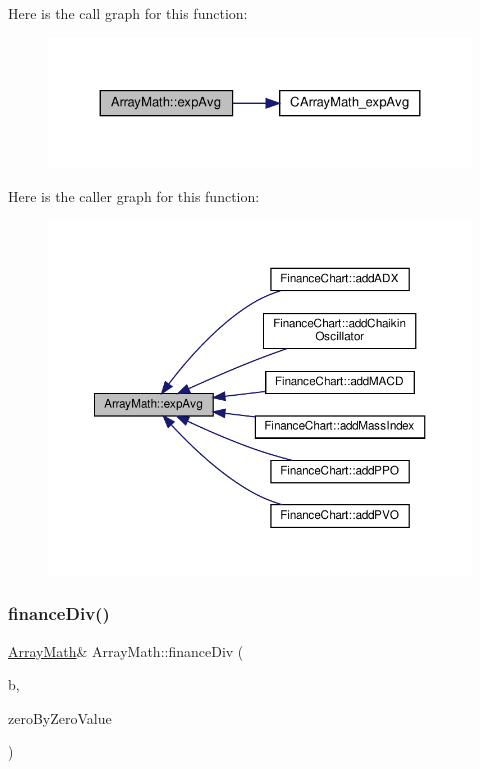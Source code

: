 Here is the call graph for this function\+:
\nopagebreak
\begin{figure}[H]
\begin{center}
\leavevmode
\includegraphics[width=324pt]{class_array_math_a2f9029cfd45e1094dd6aeb549bbcd107_cgraph}
\end{center}
\end{figure}
Here is the caller graph for this function\+:
\nopagebreak
\begin{figure}[H]
\begin{center}
\leavevmode
\includegraphics[width=350pt]{class_array_math_a2f9029cfd45e1094dd6aeb549bbcd107_icgraph}
\end{center}
\end{figure}
\mbox{\label{class_array_math_a854177572cefc64f20462ad56e74038e}} 
\subsubsection{\texorpdfstring{finance\+Div()}{financeDiv()}}
{\footnotesize\ttfamily \hyperlink{class_array_math}{Array\+Math}\& Array\+Math\+::finance\+Div (\begin{DoxyParamCaption}\item[{\hyperlink{class_double_array}{Double\+Array}}]{b,  }\item[{double}]{zero\+By\+Zero\+Value }\end{DoxyParamCaption})\hspace{0.3cm}{\ttfamily [inline]}}




